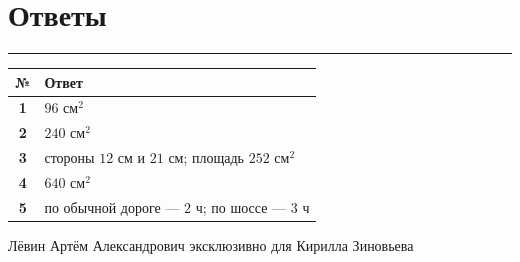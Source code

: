 \documentclass[a4paper,12pt]{article}
\newcommand{\sectionline}{%
  \par
  \noindent
  \color{accent}\rule{\linewidth}{0.45pt}
  \color{textgray}
  \par
}
\begin{document}

\clearpage

\section*{Ответы}
\sectionline

\renewcommand{\arraystretch}{1.35}

\begin{table}[ht]
\centering

\begin{tabularx}{\linewidth}{@{}>{\bfseries}cX@{}}
\toprule
№ & Ответ \\
\midrule
1 & $96\text{ см}^2$ \\

2 & $240\text{ см}^2$ \\

3 & стороны $12$ см и $21$ см; площадь $252\text{ см}^2$ \\

4 & $640\text{ см}^2$ \\

5 & по обычной дороге --- $2$ ч; по шоссе --- $3$ ч \\
\bottomrule
\end{tabularx}

\end{table}

\vfill

\begin{center}
\small\color{darkaccent}
Лёвин Артём Александрович эксклюзивно для Кирилла Зиновьева
\end{center}
\end{document}
